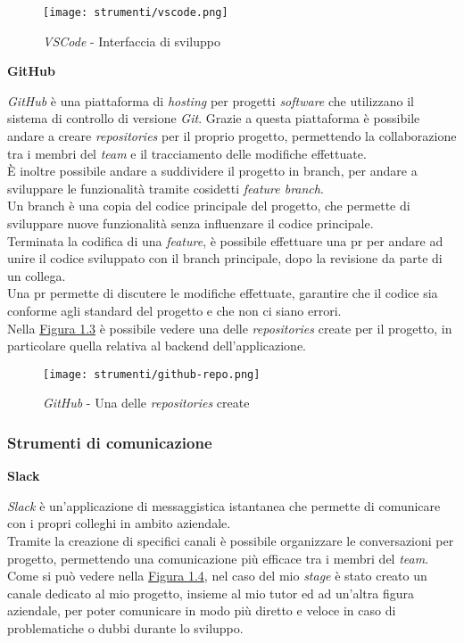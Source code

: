 \begin{figure}[H]
    \label{fig:vscode}
    \centering
    \texttt{[image: strumenti/vscode.png]}
    \caption{\textit{VSCode} - Interfaccia di sviluppo}
\end{figure}

\noindent \textbf{GitHub\\}

\noindent \textit{GitHub} è una piattaforma di \textit{hosting} per progetti \textit{software} che utilizzano il sistema di controllo di versione \textit{Git}.
Grazie a questa piattaforma è possibile andare a creare \textit{repositories} per il proprio progetto, permettendo la collaborazione tra i membri del \textit{team} e il tracciamento delle modifiche effettuate. \\
È inoltre possibile andare a suddividere il progetto in \gls{branch}, per andare a sviluppare le funzionalità tramite cosidetti \textit{feature branch}.\\
Un \gls{branch} è una copia del codice principale del progetto, che permette di sviluppare nuove funzionalità senza influenzare il codice principale.\\
Terminata la codifica di una \textit{feature}, è possibile effettuare una \gls{pr} per andare ad unire il codice sviluppato con il \gls{branch} principale, dopo la revisione da parte di un collega.\\
Una \gls{pr} permette di discutere le modifiche effettuate, garantire che il codice sia conforme agli standard del progetto e che non ci siano errori.\\
Nella {\hyperref[fig:github]{Figura 1.3}} è possibile vedere una delle \textit{repositories} create per il progetto, in particolare quella relativa al \gls{backend} dell'applicazione.

\begin{figure}[H]
    \label{fig:github} 
    \centering
    \texttt{[image: strumenti/github-repo.png]}
    \caption{\textit{GitHub} - Una delle \textit{repositories} create}
\end{figure}

\pagebreak
\subsubsection{Strumenti di comunicazione}
\label{sez:strumenti-comunicazione}


\noindent \textbf{Slack\\}

\noindent \textit{Slack} è un'applicazione di messaggistica istantanea che permette di comunicare con i propri colleghi in ambito aziendale. \\
Tramite la creazione di specifici canali è possibile organizzare le conversazioni per progetto, permettendo una comunicazione più efficace tra i membri del \textit{team}.\\
Come si può vedere nella {\hyperref[fig:slack]{Figura 1.4}}, nel caso del mio \textit{stage} è stato creato un canale dedicato al mio progetto, insieme al mio tutor ed ad un'altra figura aziendale, per poter comunicare in modo più diretto e veloce 
in caso di problematiche o dubbi durante lo sviluppo.

